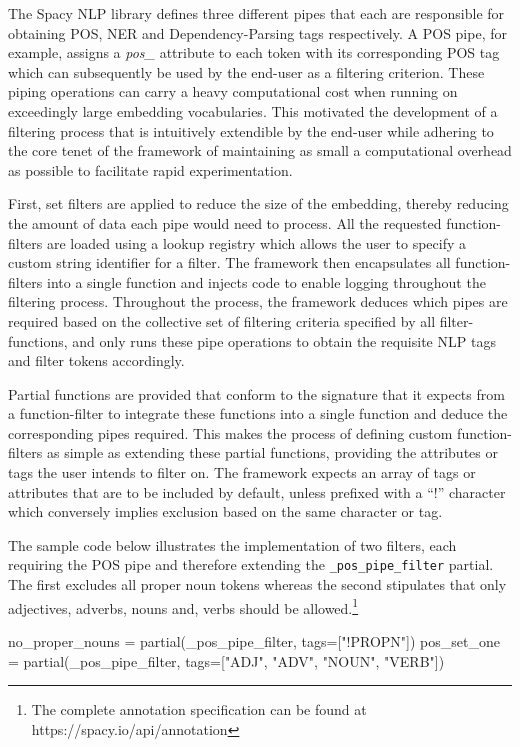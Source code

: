 \documentclass[../../fyp.tex]{subfiles}
\begin{document}
The Spacy NLP library defines three different pipes that each are responsible for obtaining POS, NER and Dependency-Parsing tags respectively. A POS pipe, for example, assigns a \textit{pos\_} attribute to each token with its corresponding POS tag which can subsequently be used by the end-user as a filtering criterion. These piping operations can carry a heavy computational cost when running on exceedingly large embedding vocabularies. This motivated the development of a filtering process that is intuitively extendible by the end-user while adhering to the core tenet of the framework of maintaining as small a computational overhead as possible to facilitate rapid experimentation.

First, set filters are applied to reduce the size of the embedding, thereby reducing the amount of data each pipe would need to process. All the requested function-filters are loaded using a lookup registry which allows the user to specify a custom string identifier for a filter. The framework then encapsulates all function-filters into a single function and injects code to enable logging throughout the filtering process. Throughout the process, the framework deduces which pipes are required based on the collective set of filtering criteria specified by all filter-functions, and only runs these pipe operations to obtain the requisite NLP tags and filter tokens accordingly.

Partial functions are provided that conform to the signature that it expects from a function-filter to integrate these functions into a single function and deduce the corresponding pipes required. This makes the process of defining custom function-filters as simple as extending these partial functions, providing the attributes or tags the user intends to filter on. The framework expects an array of tags or attributes that are to be included by default, unless prefixed with a \enquote{!} character which conversely implies exclusion based on the same character or tag. 

The sample code below illustrates the implementation of two filters, each requiring the POS pipe and therefore extending the \texttt{\_pos\_pipe\_filter} partial. The first excludes all proper noun tokens whereas the second stipulates that only adjectives, adverbs, nouns and, verbs should be allowed.\footnote{The complete annotation specification can be found at https://spacy.io/api/annotation} 

\begin{code}
no_proper_nouns = partial(_pos_pipe_filter, tags=["!PROPN"])
pos_set_one = partial(_pos_pipe_filter, tags=["ADJ", "ADV", "NOUN", "VERB"])
\end{code}
\end{document}
